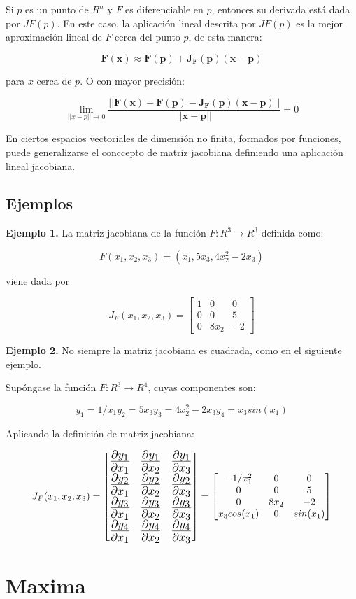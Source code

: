 \documentclass[10pt]{article}
\begin{document}
Si $p$ es un punto de $R^n$ y $F$ es diferenciable en $p$, entonces su derivada está dada por $JF(p)$. En este caso, la aplicación lineal descrita por $JF(p)$ es la mejor aproximación lineal de $F$ cerca del punto $p$, de esta manera:

$$
\mathbf{F(x) \approx F(p) + J_F(p)(x-p)}
$$

para $x$ cerca de $p$. O con mayor precisión:

$$
\lim\limits_{||x-p|| \to 0}\frac{||\mathbf{F(x) - F(p) -J_F(p)(x-p)||}}{\mathbf{||x-p||}}=0
$$


En ciertos espacios vectoriales de dimensión no finita, formados por funciones, puede generalizarse el conccepto de matriz jacobiana definiendo una aplicación lineal jacobiana.

\subsection{Ejemplos}

\noindent\textbf{Ejemplo 1.} La matriz jacobiana de la función $F \colon R^3 \rightarrow R^3$ definida como:

$$
F(x_1, x_2, x_3) = (x_1, 5x_3, 4x_2^2 - 2x_3)
$$

viene dada por

$$
J_F(x_1, x_2, x_3) =
\begin{bmatrix}
1 & 0 & 0 \\
0 & 0 & 5 \\
0 & 8x_2 & -2
\end{bmatrix}
$$


\noindent\textbf{Ejemplo 2.} No siempre la matriz jacobiana es cuadrada, como en el siguiente ejemplo.


Supóngase la función $F \colon R^3 \rightarrow R^4$, cuyas componentes son:

$$
y_1 = 1/x_1
y_2 = 5x_3
y_3 = 4x_2^2 - 2x_3
y_4 = x_3sin(x_1)
$$

Aplicando la definición de matriz jacobiana:

\begin{equation*}
J_F(x_1, x_2, x_3) = 
{\LARGE\begin{bmatrix}
\frac{\partial y_1}{\partial x_1} & \frac{\partial y_1}{\partial x_2} & \frac{\partial y_1}{\partial x_3} \\
\frac{\partial y_2}{\partial x_1} & \frac{\partial y_2}{\partial x_2} & \frac{\partial y_2}{\partial x_3} \\
\frac{\partial y_3}{\partial x_1} & \frac{\partial y_3}{\partial x_2} & \frac{\partial y_3}{\partial x_3} \\
\frac{\partial y_4}{\partial x_1} & \frac{\partial y_4}{\partial x_2} & \frac{\partial y_4}{\partial x_3} 
\end{bmatrix}}
=
\begin{bmatrix}
-1/x_1^2 & 0 & 0 \\
0 & 0 & 5 \\
0 & 8x_2 & -2 \\
x_3cos(x_1) & 0 & sin(x_1)
\end{bmatrix}
\end{equation*}

\section{Maxima}
\end{document}
